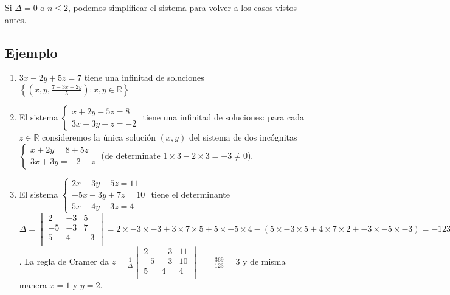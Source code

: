 Si $\Delta = 0$ o $n \leq 2$, podemos simplificar el sistema para volver a los
casos vistos antes.

\subsection*{Ejemplo}

\begin{enumerate}
\item $3x - 2y + 5z = 7$ tiene una infinitad de soluciones
  $\left\{ \left(x, y, \frac{7 - 3x + 2y}{5}\right) :
x, y \in {\mathbb R}\right\}$

  \item El sistema 
    $\left\{
\begin{aligned}
  x + 2 y -5z = 8 \\
  3x + 3 y + z = -2
\end{aligned}\right.$ tiene una infinitad de soluciones: para cada
$z \in \mathbb R$ consideremos la única solución $(x,y)$
 del sistema de dos incógnitas $\left\{
\begin{aligned}
  x + 2 y = 8 + 5z \\
  3x + 3 y = -2 - z
\end{aligned}\right.$ (de determinate $1 \times 3 - 2 \times 3 = -3 \neq 0$).

\item El sistema
  $\left\{
\begin{aligned}
  2x - 3y +5z = 11 \\
  -5x - 3y + 7z = 10 \\
  5x + 4y - 3z = 4
\end{aligned}\right.$ tiene el determinante
$\Delta = \begin{vmatrix}
  2 & -3 & 5 \\
  -5 & -3 & 7 \\
  5 & 4 & -3 \\
 \end{vmatrix} =
2 \times -3 \times -3 + 3 \times 7 \times 5 + 5 \times -5 \times 4
- {(5 \times -3 \times 5 + 4 \times 7 \times 2 + -3 \times -5 \times -3)} =
-123$. La regla de Cramer da
$z = \frac{1}{\Delta} \begin{vmatrix}
  2 & -3 & 11 \\
  -5 & -3 & 10 \\
  5 & 4 & 4 \\
 \end{vmatrix} = \frac{-369}{-123} = 3$ y de misma manera $x = 1$ y $y = 2$.


\end{enumerate}
